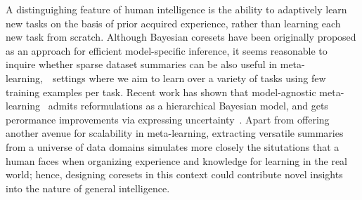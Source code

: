 A distinguighing feature of human intelligence is the ability to adaptively learn new tasks on the basis of prior acquired experience, rather than learning each new task from scratch. Although Bayesian coresets have been originally proposed as an approach for efficient model-specific inference, it seems reasonable to inquire whether sparse dataset summaries can be also useful in meta-learning,~\ie~settings where we aim to learn over a variety of tasks using few training examples per task. Recent work has shown that model-agnostic meta-learning~\citep{finn17} admits reformulations as a hierarchical Bayesian model, and gets perormance improvements via expressing uncertainty~\citep{grant18,finn18}. Apart from offering another avenue for scalability in meta-learning, extracting versatile summaries from a universe of data domains simulates more closely the situtations that a human faces when organizing experience and knowledge for learning in the real world; hence, designing coresets in this context could contribute novel insights into the nature of general intelligence.
